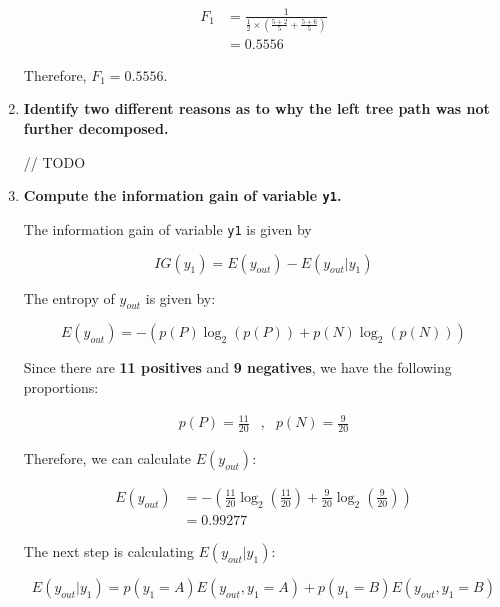 \documentclass[12pt]{article}
\begin{document}
\begin{enumerate}[leftmargin=\labelsep]
          \[
              \begin{aligned}
                  F_1 & = \frac{1}{\frac{1}{2} \times \left(\frac{5 + 2}{5} + \frac{5 + 6}{5}\right)} \\
                      & = 0.5556
              \end{aligned}
          \]

          Therefore, \(F_1 = 0.5556\).

    \item \textbf{Identify two different reasons as to why the left tree path was not further decomposed.}

          // TODO

    \item \textbf{Compute the information gain of variable \texttt{y1}.}

          The information gain of variable \texttt{y1} is given by

          \begin{equation}\label{ex4-ig}
              IG(y_1) = E(y_{out}) - E(y_{out} | y_1)
          \end{equation}

          The entropy of \(y_{out}\) is given by:

          \[
              E(y_{out}) = - \left(p(P) \log_2 \left(p(P)\right) + p(N) \log_2 \left(p(N)\right)\right)
          \]

          Since there are \textbf{11 positives} and \textbf{9 negatives}, we have the following proportions:

          \[
              \begin{array}{lcr}
                  p(P) = \frac{11}{20} & , & p(N) = \frac{9}{20}
              \end{array}
          \]

          Therefore, we can calculate $E(y_{out})$:

          \[
              \begin{aligned}
                  E(y_{out}) & = - \left(\frac{11}{20} \log_2\left(\frac{11}{20}\right) + \frac{9}{20} \log_2\left(\frac{9}{20}\right)\right) \\
                             & = 0.99277
              \end{aligned}
          \]

          The next step is calculating $E(y_{out} | y_1)$:

          \begin{equation}\label{ex4-e-yout-y1}
              E(y_{out} | y_1) = p(y_1 = A) E(y_{out} , y_1 = A) + p(y_1 = B) E(y_{out} , y_1 = B)
          \end{equation}


\end{enumerate}
\end{document}
